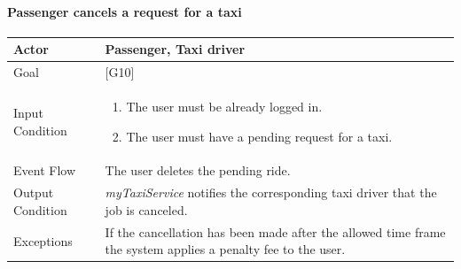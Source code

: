 \documentclass[a4paper,11pt]{report} %
\newcommand{\mts}{\mbox{\normalfont\itshape myTaxiService}}
\begin{document}
		\noindent%
		\begin{minipage}{\linewidth}
			\vspace*{-0.7cm}
		\end{minipage}
	

	
	\pagebreak
	
	\paragraph{Passenger cancels a request for a taxi}
	\begin{center}
		\begin{tabular}{| l | p{9cm} |}\hline
			Actor & Passenger, Taxi driver\\\hline
			Goal & {[}G10{]} \\\hline
			Input Condition & \begin{enumerate}
								\item The user must be already logged in.
								\item The user must have a pending request for a taxi.
						   	  \end{enumerate} \\\hline
			Event Flow & The user deletes the pending ride.\\\hline
			Output Condition & \mts{} notifies the corresponding taxi driver that the job is canceled.\\\hline
			Exceptions & If the cancellation has been made after the allowed time frame the system applies a penalty fee to the user.\\\hline
		\end{tabular}
	\end{center}
	
\end{document}
